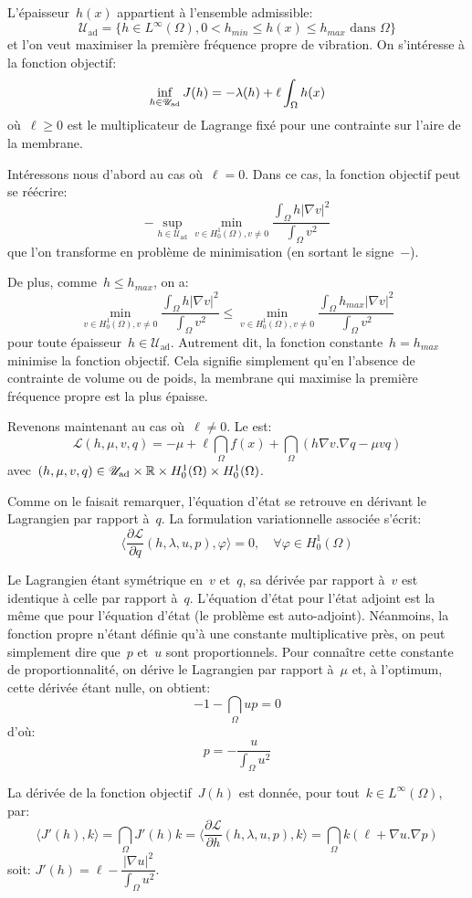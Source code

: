 L'épaisseur~$h(x)$ appartient à l'ensemble admissible:
\[ \mathscr{U}_{\text{ad}} = \{ h\in L^\infty(\Omega), 0< h_{min}\le h(x)\le h_{max} \text{ dans }\Omega \} \]
et l'on veut maximiser la première fréquence propre de vibration. On s'intéresse à la fonction objectif:
\[\colorblue \inf_{h\in\mathscr{U}_{\text{ad}}} J(h) = -\lambda(h)+\ell \dint_\Omega h(x) \]
où~$\ell\ge0$ est le multiplicateur de Lagrange fixé pour une contrainte sur l'aire de la membrane.

\medskip
Intéressons nous d'abord au cas où~$\ell=0$. Dans ce cas, la fonction objectif peut se réécrire:
\[ -\sup_{h\in\mathscr{U}_{\text{ad}}} \min_{v\in H^1_0(\Omega), v\ne0} \dfrac{\int_\Omega h|\nabla v|^2}{\int_\Omega v^2} \]
que l'on transforme en problème de minimisation (en sortant le signe~$-$).

De plus, comme~$h\le h_{max}$, on a:
\[ \min_{v\in H^1_0(\Omega), v\ne0} \dfrac{\int_\Omega h|\nabla v|^2}{\int_\Omega v^2}
\le \min_{v\in H^1_0(\Omega), v\ne0} \dfrac{\int_\Omega h_{max}|\nabla v|^2}{\int_\Omega v^2} \]
pour toute épaisseur~$h\in\mathscr{U}_{\text{ad}}$. Autrement dit, la fonction constante~$h=h_{max}$ minimise la fonction objectif. Cela signifie simplement qu'en l'absence de contrainte de volume ou de poids, la membrane qui maximise la première fréquence propre est la plus épaisse.

\medskip
Revenons maintenant au cas où~$\ell\ne0$. Le  est:
\[ \mathscr{L}(h,\mu,v,q) = -\mu +\ell\dint_\Omega f(x)
+\dint_\Omega (h\nabla v.\nabla q -\mu vq)\]
avec~$(h,\mu,v,q)\in\mathscr{U}_{\text{ad}}\times\mathbb R\times H^1_0(\Omega)\times H^1_0(\Omega)$.

Comme on le faisait remarquer, l'équation d'état se retrouve en dérivant le Lagrangien par rapport à~$q$. La formulation variationnelle associée s'écrit:
\[ \langle\dfrac{\partial\mathscr{L}}{\partial q}(h,\lambda,u,p),\varphi\rangle=0,
\quad \forall \varphi\in H^1_0(\Omega) \]

Le Lagrangien étant symétrique en~$v$ et~$q$, sa dérivée par rapport à~$v$ est identique à celle par rapport à~$q$. L'équation d'état pour l'état adjoint est la même que pour l'équation d'état (le problème est auto-adjoint). Néanmoins, la fonction propre n'étant définie qu'à une constante multiplicative près, on peut simplement dire que~$p$ et~$u$ sont proportionnels. Pour connaître cette constante de proportionnalité, on dérive le Lagrangien par rapport à~$\mu$ et, à l'optimum, cette dérivée étant nulle, on obtient:
\[ -1-\dint_\Omega up =0 \]
d'où:
\[ p=-\dfrac{u}{\int_\Omega u^2} \]

\medskip
La dérivée de la fonction objectif~$J(h)$ est donnée, pour tout~$k\in L^\infty(\Omega)$, par:
\[ \langle J'(h),k\rangle = \dint_\Omega J'(h)k = \langle\dfrac{\partial\mathscr{L}}{\partial h}(h,\lambda,u,p),k\rangle = \dint_\Omega k(\ell+\nabla u.\nabla p) \]
soit: $J'(h)=\ell - \dfrac{|\nabla u|^2}{\int_\Omega u^2}$.








